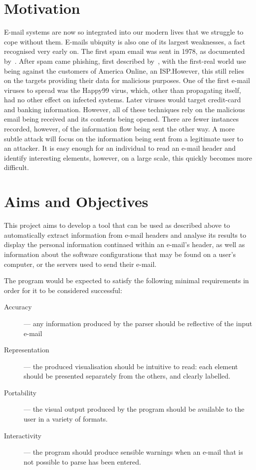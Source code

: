 \documentclass[a4paper,DIV=13,BCOR=7mm,abstract=yes,twoside,10pt]{scrreprt}
\begin{document}
    \section{Motivation}

    E-mail systems are now so integrated into our modern lives that we struggle to
    cope without them.  E-mails ubiquity is also one of its largest weaknesses, a
    fact recognised very early on.  The first spam email was sent in 1978, as
    documented by~\cite{templeton}.  After spam came phishing, first described
    by~\cite{felix1987system}, with the first-real world use being against the
    customers of America Online, an ISP.\@  However, this still relies on the
    targets providing their data for malicious purposes. One of the first e-mail
    viruses to spread was the Happy99 virus, which, other than propagating itself,
    had no other effect on infected systems. Later viruses would target credit-card
    and banking information. However, all of these techniques rely on the malicious
    email being received and its contents being opened.  There are fewer instances
    recorded, however, of the information flow being sent the other way.  A more
    subtle attack will focus on the information being sent from a legitimate user to
    an attacker. It is easy enough for an individual to read an e-mail header and
    identify interesting elements, however, on a large scale, this quickly becomes
    more difficult.

    \section{Aims and Objectives}

    This project aims to develop a tool that can be used as described above to
    automatically extract information from e-mail headers and analyse its results to
    display the personal information continaed within an e-mail's header, as well as
    information about the software configurations that may be found on a user's
    computer, or the servers used to send their e-mail.

    The program would be expected to satisfy the following minimal requirements
    in order for it to be considered successful: \begin{description} \item
    [{Accuracy}] --- any information produced by the parser should be reflective
    of the input e-mail

    \item [{Representation}] --- the produced visualisation should be intuitive
    to read: each element should be presented separately from the others, and
    clearly labelled.

    \item [{Portability}] --- the visual output produced by the program should
    be available to the user in a variety of formats.

    \item [{Interactivity}] --- the program should produce sensible warnings
    when an e-mail that is not possible to parse has been entered.
  \end{description}
\end{document}
